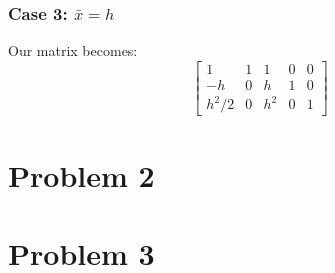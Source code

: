 \documentclass{article}
\begin{document}
\subsubsection*{Case 3: $\bar x=h$}
Our matrix becomes:
\begin{equation}
\begin{bmatrix}
1 & 1 & 1 & 0 & 0\\
-h & 0 & h & 1 & 0\\
h^2/2 & 0 & h^2 & 0 & 1
\end{bmatrix}
\end{equation}

\section*{Problem 2}
\section*{Problem 3}
\end{document}
